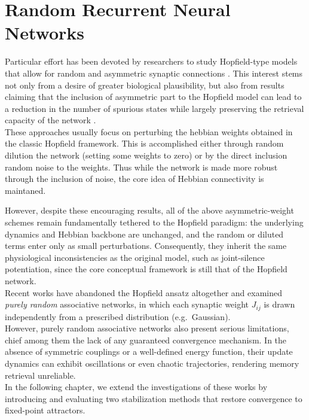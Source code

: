 \documentclass[a4paper,12pt]{report}
\begin{document}
\chapter{Random Recurrent Neural Networks}\label{sec:random_rnn}

Particular effort has been devoted by researchers to study Hopfield-type models that 
allow for random and asymmetric synaptic connections \cite{Sompolinsky1988, Crisanti1987, 
Derrida1987, Xu1996}. 
This interest stems not only from a desire of greater biological plausibility, but 
also from results claiming that the inclusion of asymmetric part to the Hopfield 
model can lead to a reduction in the number of spurious states while largely 
preserving the retrieval capacity of the network 
\cite{Parisi_1986, Hertz1986, Chengxiang2000}.\\
These approaches usually focus on perturbing the hebbian weights obtained in the classic 
Hopfield framework. This is accomplished either through random dilution the network (setting some 
weights to zero) or by the direct inclusion random noise to the weights. Thus while the 
network is made more robust through the inclusion of noise, the core idea of Hebbian 
connectivity is maintaned. 

However, despite these encouraging results, all of the above asymmetric-weight schemes 
remain fundamentally tethered to the Hopfield paradigm: the underlying dynamics and 
Hebbian backbone are unchanged, and the random or diluted terms enter only as small 
perturbations.  Consequently, they inherit the same physiological inconsistencies as 
the original model, such as joint-silence potentiation, since the core conceptual 
framework is still that of the Hopfield network. \\

Recent works\cite{Scardecchia2023,Student2024} have abandoned the Hopfield ansatz altogether and examined 
{\em purely random} associative networks, in which each synaptic weight 
\(J_{ij}\) is drawn independently from a prescribed distribution (e.g.\ Gaussian). \\
However, purely random associative networks also present serious limitations, chief 
among them the lack of any guaranteed convergence mechanism.  In the absence of 
symmetric couplings or a well-defined energy function, their update dynamics can 
exhibit oscillations or even chaotic trajectories, rendering memory retrieval 
unreliable.  \\
In the following chapter, we extend the investigations of 
these works by introducing and evaluating two stabilization methods that restore 
convergence to fixed-point attractors.  
\end{document}
